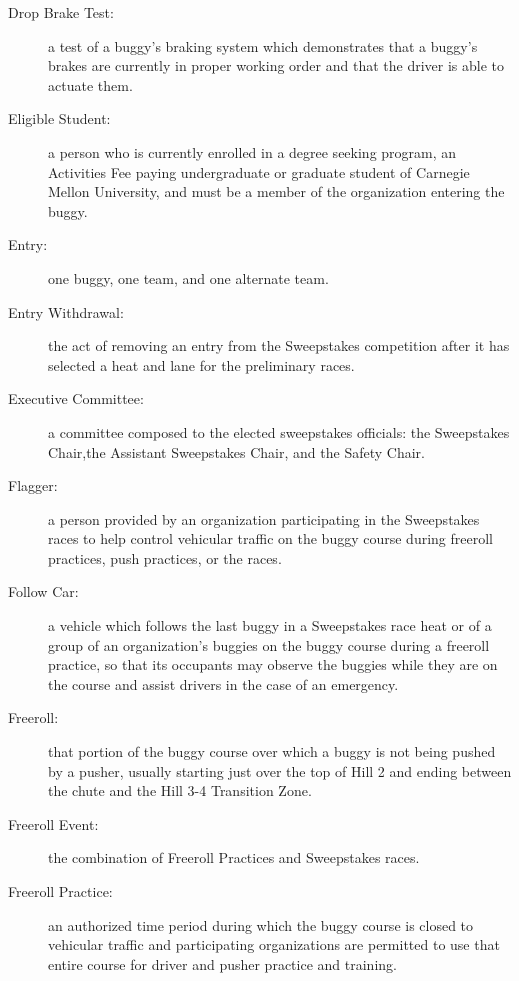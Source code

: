 \begin{description}
	\item[Drop Brake Test:]
	a test of a buggy's braking system which demonstrates that a buggy's brakes are currently in proper working order and that the driver is able to actuate them.

	\item[Eligible Student:]
	a person who is currently enrolled in a degree seeking program, an Activities Fee paying undergraduate or graduate student of Carnegie Mellon University, and must be a member of the organization entering the buggy.

	\item[Entry:]
	one buggy, one team, and one alternate team.

	\item[Entry Withdrawal:]
	the act of removing an entry from the Sweepstakes competition after it has selected a heat and lane for the preliminary races.

	\item[Executive Committee:]
	a committee composed to the elected sweepstakes officials: the Sweepstakes Chair,the Assistant Sweepstakes Chair, and the Safety Chair.

	\item[Flagger:]
	a person provided by an organization participating in the Sweepstakes races to help control vehicular traffic on the buggy course during freeroll practices, push practices, or the races.

	\item[Follow Car:]
	a vehicle which follows the last buggy in a Sweepstakes race heat or of a group of an organization's buggies on the buggy course during a freeroll practice, so that its occupants may observe the buggies while they are on the course and assist drivers in the case of an emergency.

	\item[Freeroll:]
	that portion of the buggy course over which a buggy is not being pushed by a pusher, usually starting just over the top of Hill 2 and ending between the chute and the Hill 3-4 Transition Zone.

	\item[Freeroll Event:]
	the combination of Freeroll Practices and Sweepstakes races.

	\item[Freeroll Practice:]
	an authorized time period during which the buggy course is closed to vehicular traffic and participating organizations are permitted to use that entire course for driver and pusher practice and training.


\end{description}
